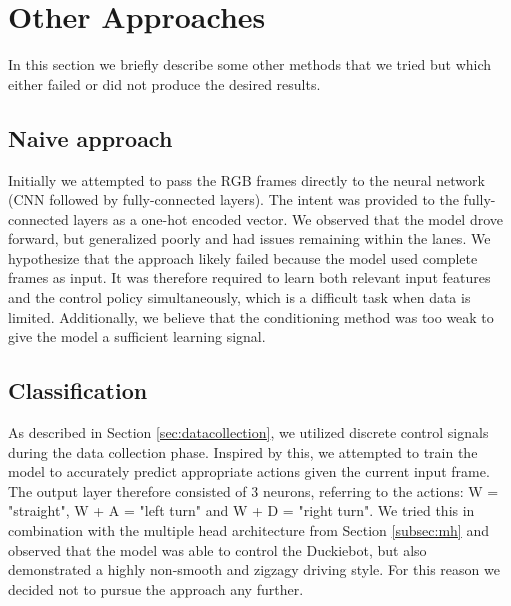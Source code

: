 \section{Other Approaches}
\label{appendix:other}

In this section we briefly describe some other methods that we tried but which either failed or did not produce the desired results.

\subsection{Naive approach}
Initially we attempted to pass the RGB frames directly to the neural network (CNN followed by fully-connected layers). 
The intent was provided to the fully-connected layers as a one-hot encoded vector. We observed that the model drove forward, but generalized poorly and had issues remaining within the lanes. 
We hypothesize that the approach likely failed because the model used complete frames as input. It was therefore required to learn both relevant input features and the control policy simultaneously, which is a difficult task when data is limited.
Additionally, we believe that the conditioning method was too weak to give the model a sufficient learning signal.

\subsection{Classification}
\label{subsec:class_strat}
As described in Section \ref{sec:datacollection}, we utilized discrete control signals during the data collection phase. Inspired by this, we attempted to train the model to accurately predict appropriate actions given the current input frame. 
The output layer therefore consisted of 3 neurons, referring to the actions: W = "straight", W + A = "left turn" and W + D = "right turn". We tried this in combination with the multiple head architecture from Section \ref{subsec:mh} and 
observed that the model was able to control the Duckiebot, but also demonstrated a highly non-smooth and zigzagy driving style. For this reason we decided not to pursue the approach any further.




